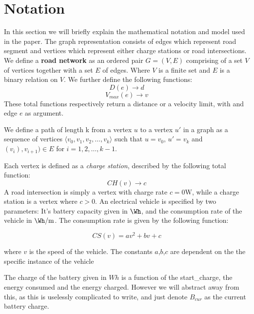 \section{Notation}
In this section we will briefly explain the mathematical notation and model used in the paper. The graph representation consists of edges which represent road segment and vertices which represent either charge stations or road intersections. We define a \textbf{road network} as an ordered pair \(G=(V,E)\) comprising of a set $V$ of vertices together with a set $E$ of edges. Where $V$ is a finite set and $E$ is a binary relation on $V$. We further define the following functions:
\[ D(e)\rightarrow d \] 
\[ V_{max}(e)\rightarrow v \] 
These total functions respectively return a distance or a velocity limit, with and edge $e$ as argument.

We define a path of length k from a vertex $u$ to a vertex $u'$ in a graph as a sequence of vertices $\langle v_0,v_1,v_2,\dots,v_k \rangle$ such that $u=v_0$, $u'=v_k$ and $(v_{i}),v_{i+1})\in E$ for $i=1,2,\dots ,k-1$.

Each vertex is defined as a \textit{charge station}, described by the following total function:
\[CH(v)\rightarrow c\]
A road intersection is simply a vertex with charge rate $c = 0\si{\W}$, while a charge station is a vertex where $c > 0$. An electrical vehicle is specified by two parameters: It's battery capacity given in $\si{\Wh}$, and the consumption rate of the vehicle in $\si{\Wh\per\metre}$. The consumption rate is given by the following function:

\[CS(v)=av^2+bv+c\]

where $v$ is the speed of the vehicle. The constants $a$,$b$,$c$ are dependent on the the specific instance of the vehicle  

The charge of the battery given in $\si{Wh}$ is a function of the start_charge, the energy consumed and the energy charged. However we will abstract away from this, as this is uselessly complicated to write, and just denote $B_{cur}$ as the current battery charge.
